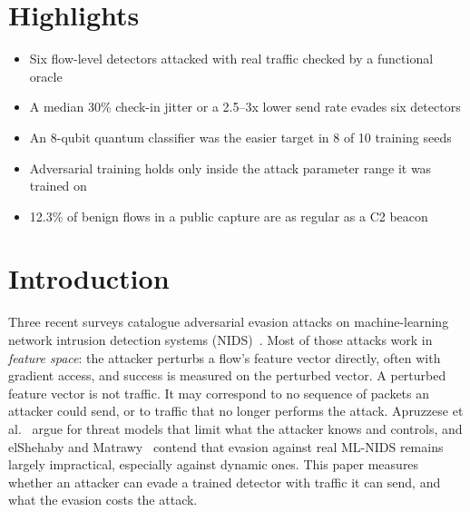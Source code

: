 \documentclass[preprint,12pt]{elsarticle}
\newcommand{\todo}[1]{\textbf{[TODO: #1]}}
\begin{document}
\section*{Highlights}
\begin{itemize}
  \item Six flow-level detectors attacked with real traffic checked by a functional oracle
  \item A median 30\% check-in jitter or a 2.5--3x lower send rate evades six detectors
  \item An 8-qubit quantum classifier was the easier target in 8 of 10 training seeds
  \item Adversarial training holds only inside the attack parameter range it was trained on
  \item 12.3\% of benign flows in a public capture are as regular as a C2 beacon
\end{itemize}

\section{Introduction}
\label{sec:intro}

Three recent surveys catalogue adversarial evasion attacks on machine-learning network intrusion
detection systems (NIDS)~\cite{nids_survey2023,ennaji2024,nids_understanding2026}. Most of those attacks
work in \emph{feature space}: the attacker perturbs a flow's feature vector directly, often with
gradient access, and success is measured on the perturbed vector. A perturbed feature vector is not
traffic. It may correspond to no sequence of packets an attacker could send, or to traffic that no
longer performs the attack. Apruzzese et al.~\cite{apruzzese2022} argue for threat models that limit
what the attacker knows and controls, and elShehaby and Matrawy~\cite{elshehaby2023} contend that
evasion against real ML-NIDS remains largely impractical, especially against dynamic ones. This
paper measures whether an attacker can evade a trained detector with traffic it can send, and what
the evasion costs the attack.
\end{document}
